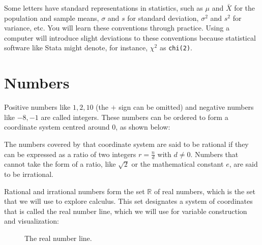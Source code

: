 

Some letters have standard representations in statistics, such as $\mu$ and $\bar X$ for the population and sample means, $\sigma$ and $s$ for standard deviation, $\sigma^2$ and $s^2$ for variance, etc. You will learn these conventions through practice. Using a computer will introduce slight deviations to these conventions because statistical software like Stata might denote, for instance, $\chi^2$ as \texttt{chi(2)}.

\section{Numbers}

Positive numbers like $1, 2, 10$ (the $+$ sign can be omitted) and negative numbers like $-8, -1$ are called integers. These numbers can be ordered to form a coordinate system centred around $0$, as shown below:


The numbers covered by that coordinate system are said to be rational if they can be expressed as a ratio of two integers $r = \frac{n}{d}$ with $d \neq 0$. Numbers that cannot take the form of a ratio, like $\sqrt{2}$ or the mathematical constant $e$, are said to be irrational.

Rational and irrational numbers form the set $\mathbb{R}$ of real numbers, which is the set that we will use to explore calculus. This set designates a system of coordinates that is called the real number line, which we will use for variable construction and visualization:

\begin{figure}[h]
  \caption{The real number line.}
\end{figure}

